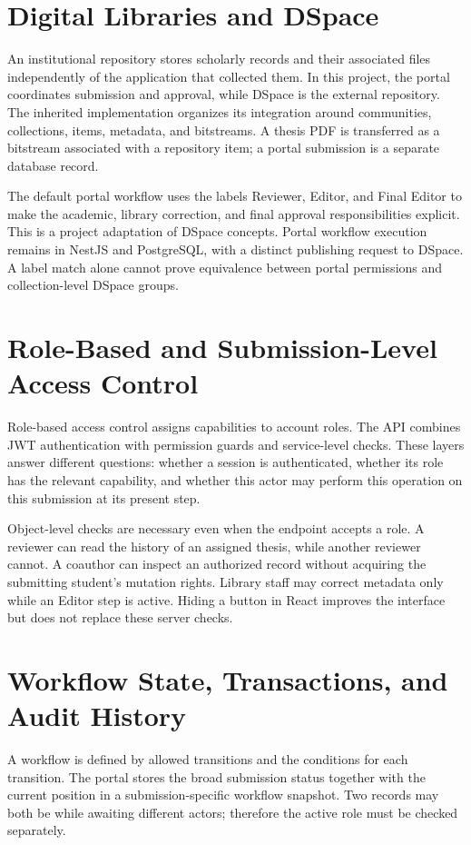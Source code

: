 \documentclass[11pt,a4paper]{report}
\newcommand{\code}[1]{{\small\texttt{\detokenize{#1}}}}
\begin{document}
\section{Digital Libraries and DSpace}
An institutional repository stores scholarly records and their associated files independently of the application that collected them. In this project, the portal coordinates submission and approval, while DSpace is the external repository. The inherited implementation organizes its integration around communities, collections, items, metadata, and bitstreams. A thesis PDF is transferred as a bitstream associated with a repository item; a portal submission is a separate database record.

The default portal workflow uses the labels Reviewer, Editor, and Final Editor to make the academic, library correction, and final approval responsibilities explicit. This is a project adaptation of DSpace concepts. Portal workflow execution remains in NestJS and PostgreSQL, with a distinct publishing request to DSpace. A label match alone cannot prove equivalence between portal permissions and collection-level DSpace groups.

\section{Role-Based and Submission-Level Access Control}
Role-based access control assigns capabilities to account roles. The API combines JWT authentication with permission guards and service-level checks. These layers answer different questions: whether a session is authenticated, whether its role has the relevant capability, and whether this actor may perform this operation on this submission at its present step.

Object-level checks are necessary even when the endpoint accepts a role. A reviewer can read the history of an assigned thesis, while another reviewer cannot. A coauthor can inspect an authorized record without acquiring the submitting student's mutation rights. Library staff may correct metadata only while an Editor step is active. Hiding a button in React improves the interface but does not replace these server checks.

\section{Workflow State, Transactions, and Audit History}
A workflow is defined by allowed transitions and the conditions for each transition. The portal stores the broad submission status together with the current position in a submission-specific workflow snapshot. Two records may both be \code{reviewing} while awaiting different actors; therefore the active role must be checked separately.
\end{document}
